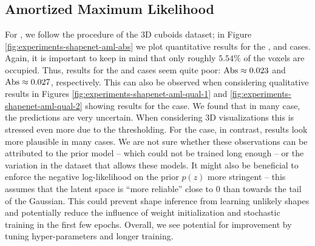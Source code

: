 \subsection{Amortized Maximum Likelihood}




For \AML, we follow the procedure of the 3D cuboids dataset; in Figure
\ref{fig:experiments-shapenet-aml-abs} we plot
quantitative results for the \easy, \moderate and \hard cases.
Again, it is important to keep in mind that only roughly $5.54\%$ of the voxels
are occupied. Thus, results for the \moderate and \hard cases seem quite poor:
$\text{Abs} \approx 0.023$ and $\text{Abs} \approx 0.027$, respectively.
This can also be observed when considering qualitative results in
Figures \ref{fig:experiments-shapenet-aml-qual-1} and
\ref{fig:experiments-shapenet-aml-qual-2} showing results for the \hard case.
We found that in many case, the predictions are very uncertain.
When considering 3D visualizations this is stressed even
more due to the thresholding. For the \moderate case, in contrast, results
look more plausible in many cases. We are not sure whether these
observations can be attributed to the prior model -- which could \eg
not be trained long enough -- or the variation in the dataset that allows
these models. It might also be beneficial to enforce the negative log-likelihood
on the prior $p(z)$ more stringent -- this assumes that the latent space
is ``more reliable'' close to $0$ than towards the tail of the Gaussian.
This could prevent shape inference from learning unlikely shapes and
potentially reduce the influence of weight initialization and stochastic
training in the first few epochs.
Overall, we see potential for improvement by tuning hyper-parameters and
longer training.

